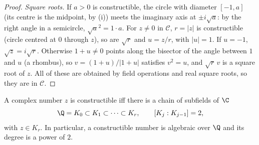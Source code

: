 \begin{proof}
\emph{Square roots.} If $a>0$ is constructible, the circle with diameter $[-1,a]$ (its centre is the midpoint, by (i)) meets the imaginary axis at $\pm i\sqrt a$: by the right angle in a semicircle, $\sqrt a^2=1\cdot a$. For $z\ne0$ in $\mathcal C$, $r=|z|$ is constructible (circle centred at $0$ through $z$), so are $\sqrt r$ and $u=z/r$, with $|u|=1$. If $u=-1$, $\sqrt z=i\sqrt r$. Otherwise $1+u\ne0$ points along the bisector of the angle between $1$ and $u$ (a rhombus), so $v=(1+u)/|1+u|$ satisfies $v^2=u$, and $\sqrt r\,v$ is a square root of $z$. All of these are obtained by field operations and real square roots, so they are in $\mathcal C$.
\end{proof}

\begin{theorem}[Wantzel]\label{thm:wantzel}
A complex number $z$ is constructible iff there is a chain of subfields of $\C$
\[
\Q=K_0\subset K_1\subset\dots\subset K_r,\qquad[K_j:K_{j-1}]=2,
\]
with $z\in K_r$. In particular, a constructible number is algebraic over $\Q$ and its degree is a power of $2$.
\end{theorem}

